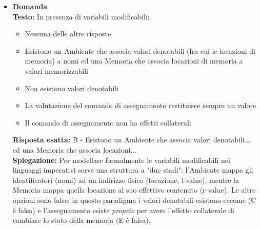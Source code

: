 \documentclass[12pt, a4paper]{article}
\newcounter{domandateoria}
\begin{document}
\begin{itemize}
    \item {}\textbf{Domanda \thedomandateoria} \\
    \textbf{Testo:} In presenza di variabili modificabili:
    \begin{itemize}
        \item[A)] Nessuna delle altre risposte
        \item[B)] Esistono un Ambiente che associa valori denotabili (fra cui le locazioni di memoria) a nomi ed una Memoria che associa locazioni di memoria a valori memorizzabili
        \item[C)] Non esistono valori denotabili
        \item[D)] La valutazione del comando di assegnamento restituisce sempre un valore
        \item[E)] Il comando di assegnamento non ha effetti collaterali
    \end{itemize}
    \textbf{Risposta esatta:} B - Esistono un Ambiente che associa valori denotabili... ed una Memoria che associa locazioni... \\
    \textbf{Spiegazione:} Per modellare formalmente le variabili modificabili nei linguaggi imperativi serve una struttura a "due stadi": l'Ambiente mappa gli identificatori (nomi) ad un indirizzo fisico (locazione, l-value), mentre la Memoria mappa quella locazione al suo effettivo contenuto (r-value). Le altre opzioni sono false: in questo paradigma i valori denotabili esistono eccome (C è falsa) e l'assegnamento esiste \textit{proprio} per avere l'effetto collaterale di cambiare lo stato della memoria (E è falsa).
    \vspace{0.3cm}

\newpage


\end{itemize}
\end{document}

